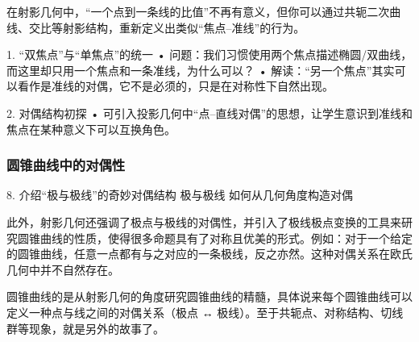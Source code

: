 在射影几何中，“一个点到一条线的比值”不再有意义，但你可以通过共轭二次曲线、交比等射影结构，重新定义出类似“焦点–准线”的行为。

1. “双焦点”与“单焦点”的统一
	•	问题：我们习惯使用两个焦点描述椭圆/双曲线，而这里却只用一个焦点和一条准线，为什么可以？
	•	解读：“另一个焦点”其实可以看作是准线的对偶，它不是必须的，只是在对称性下自然出现。

2. 对偶结构初探
	•	可引入投影几何中“点–直线对偶”的思想，让学生意识到准线和焦点在某种意义下可以互换角色。

\subsubsection{圆锥曲线中的对偶性}


	8.	介绍“极与极线”的奇妙对偶结构
极与极线	如何从几何角度构造对偶

此外，射影几何还强调了极点与极线的对偶性，并引入了极线极点变换的工具来研究圆锥曲线的性质，使得很多命题具有了对称且优美的形式。例如：对于一个给定的圆锥曲线，任意一点都有与之对应的一条极线，反之亦然。这种对偶关系在欧氏几何中并不自然存在。

圆锥曲线的是从射影几何的角度研究圆锥曲线的精髓，具体说来每个圆锥曲线可以定义一种点与线之间的对偶关系（极点 ↔ 极线）。至于共轭点、对称结构、切线群等现象，就是另外的故事了。



